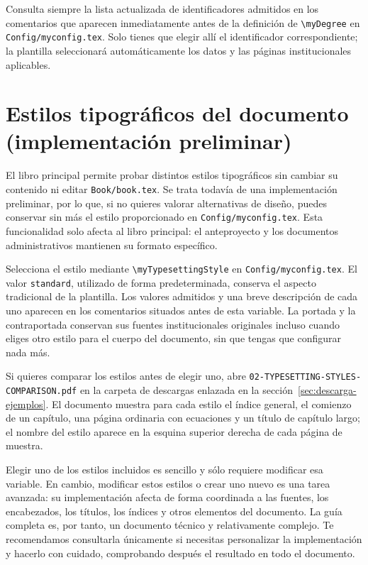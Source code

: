 Consulta siempre la lista actualizada de identificadores admitidos en los comentarios que aparecen inmediatamente antes de la definición de \texttt{\textbackslash{}myDegree} en \texttt{Config/myconfig.tex}. Solo tienes que elegir allí el identificador correspondiente; la plantilla seleccionará automáticamente los datos y las páginas institucionales aplicables.

\section{Estilos tipográficos del documento (implementación preliminar)}
\label{sec:estilos-tipograficos}

El libro principal permite probar distintos estilos tipográficos sin cambiar su contenido ni editar \texttt{Book/book.tex}. Se trata todavía de una implementación preliminar, por lo que, si no quieres valorar alternativas de diseño, puedes conservar sin más el estilo proporcionado en \texttt{Config/myconfig.tex}. Esta funcionalidad solo afecta al libro principal: el anteproyecto y los documentos administrativos mantienen su formato específico.

Selecciona el estilo mediante \texttt{\textbackslash{}myTypesettingStyle} en \texttt{Config/myconfig.tex}. El valor \texttt{standard}, utilizado de forma predeterminada, conserva el aspecto tradicional de la plantilla. Los valores admitidos y una breve descripción de cada uno aparecen en los comentarios situados antes de esta variable. La portada y la contraportada conservan sus fuentes institucionales originales incluso cuando eliges otro estilo para el cuerpo del documento, sin que tengas que configurar nada más.

Si quieres comparar los estilos antes de elegir uno, abre \texttt{02-TYPESETTING-STYLES-COMPARISON.pdf} en la carpeta de descargas enlazada en la sección~\ref{sec:descarga-ejemplos}. El documento muestra para cada estilo el índice general, el comienzo de un capítulo, una página ordinaria con ecuaciones y un título de capítulo largo; el nombre del estilo aparece en la esquina superior derecha de cada página de muestra.

Elegir uno de los estilos incluidos es sencillo y sólo requiere modificar esa variable. En cambio, modificar estos estilos o crear uno nuevo es una tarea avanzada: su implementación afecta de forma coordinada a las fuentes, los encabezados, los títulos, los índices y otros elementos del documento. La guía completa es, por tanto, un documento técnico y relativamente complejo. Te recomendamos consultarla únicamente si necesitas personalizar la implementación y hacerlo con cuidado, comprobando después el resultado en todo el documento.

